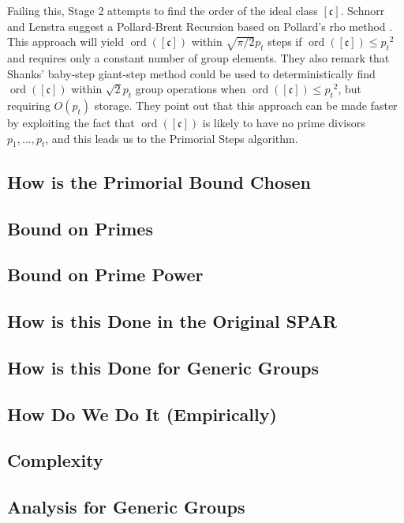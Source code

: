 \documentclass{ucalgthes1}
\theoremstyle{definition}
\DeclareMathOperator{\ord}{ord}
\newcommand{\cclass}{[\mathfrak c]}
\begin{document}
Failing this, Stage 2 attempts to find the order of the ideal class $\cclass$.  Schnorr and Lenstra \cite[p.294]{Schnorr1984} suggest a Pollard-Brent Recursion \cite{Brent1980} based on Pollard's rho method \cite{Pollard1975}.  This approach will yield $\ord(\cclass)$ within $\sqrt{\pi/2}p_t$ steps if $\ord(\cclass) \le {p_t}^2$ and requires only a constant number of group elements.  They also remark \cite[p.298]{Schnorr1984} that Shanks' baby-step giant-step method \cite{Shanks1971} could be used to deterministically find $\ord(\cclass)$ within $\sqrt{2}p_t$ group operations when $\ord(\cclass) \le {p_t}^2$, but requiring $O(p_t)$ storage.  They point out that this approach can be made faster by exploiting the fact that $\ord(\cclass)$ is likely to have no prime divisors $p_1, ..., p_t$, and this leads us to the Primorial Steps algorithm.


\subsection{How is the Primorial Bound Chosen}

\subsection{Bound on Primes}

\subsection{Bound on Prime Power}

\subsection{How is this Done in the Original SPAR}

\subsection{How is this Done for Generic Groups}

\subsection{How Do We Do It (Empirically)}



\subsection{Complexity}
\subsection{Analysis for Generic Groups}
\end{document}
